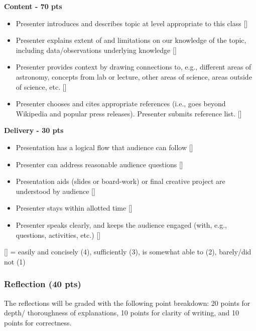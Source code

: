 \documentclass[12pt]{article}
\begin{document}
\textbf{Content - 70 pts}
\begin{itemize}[leftmargin=0.3in]
\item Presenter introduces and describes topic at level appropriate to this class [\underline{\hspace{5mm}}]
\item Presenter explains extent of and limitations on our knowledge of the topic, including data/observations underlying knowledge [\underline{\hspace{5mm}}]
\item Presenter provides context by drawing connections to, e.g., different areas of astronomy, concepts from lab or
lecture, other areas of science, areas outside of science, etc. [\underline{\hspace{5mm}}]
\item Presenter chooses and cites appropriate references (i.e., goes beyond Wikipedia and popular press releases).  Presenter submits reference list. [\underline{\hspace{5mm}}]
\end{itemize} 


\noindent \textbf{Delivery - 30 pts}
\begin{itemize}[leftmargin=0.3in]
\item Presentation has a logical flow that audience can follow [\underline{\hspace{5mm}}]
\item Presenter can address reasonable audience questions [\underline{\hspace{5mm}}]
\item Presentation aids (slides or board-work) or final creative project are understood by audience [\underline{\hspace{5mm}}]
\item Presenter stays within allotted time [\underline{\hspace{5mm}}]
\item Presenter speaks clearly, and keeps the audience engaged (with, e.g., questions, activities, etc.) [\underline{\hspace{5mm}}]
\end{itemize}
{\small [\underline{\hspace{5mm}}] = easily and concisely (4), sufficiently (3),
is somewhat able to (2), barely/did not (1)
}
\subsubsection*{Reflection (40 pts)}
\noindent
The reflections will be graded with the following point breakdown: 20 points for depth/ thoroughness of explanations, 10 points for clarity of writing, and 10 points for correctness.
\end{document}
